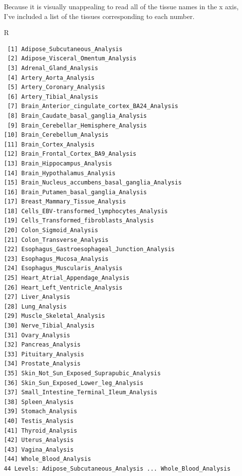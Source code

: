 \documentclass[11pt]{article}
\begin{document}
Because it is visually unappealing to read all of the tissue names in the x axis, I've included a list of the tissues corresponding to each number.


 R


\begin{verbatim}
 [1] Adipose_Subcutaneous_Analysis
 [2] Adipose_Visceral_Omentum_Analysis
 [3] Adrenal_Gland_Analysis
 [4] Artery_Aorta_Analysis
 [5] Artery_Coronary_Analysis
 [6] Artery_Tibial_Analysis
 [7] Brain_Anterior_cingulate_cortex_BA24_Analysis
 [8] Brain_Caudate_basal_ganglia_Analysis
 [9] Brain_Cerebellar_Hemisphere_Analysis
[10] Brain_Cerebellum_Analysis
[11] Brain_Cortex_Analysis
[12] Brain_Frontal_Cortex_BA9_Analysis
[13] Brain_Hippocampus_Analysis
[14] Brain_Hypothalamus_Analysis
[15] Brain_Nucleus_accumbens_basal_ganglia_Analysis
[16] Brain_Putamen_basal_ganglia_Analysis
[17] Breast_Mammary_Tissue_Analysis
[18] Cells_EBV-transformed_lymphocytes_Analysis
[19] Cells_Transformed_fibroblasts_Analysis
[20] Colon_Sigmoid_Analysis
[21] Colon_Transverse_Analysis
[22] Esophagus_Gastroesophageal_Junction_Analysis
[23] Esophagus_Mucosa_Analysis
[24] Esophagus_Muscularis_Analysis
[25] Heart_Atrial_Appendage_Analysis
[26] Heart_Left_Ventricle_Analysis
[27] Liver_Analysis
[28] Lung_Analysis
[29] Muscle_Skeletal_Analysis
[30] Nerve_Tibial_Analysis
[31] Ovary_Analysis
[32] Pancreas_Analysis
[33] Pituitary_Analysis
[34] Prostate_Analysis
[35] Skin_Not_Sun_Exposed_Suprapubic_Analysis
[36] Skin_Sun_Exposed_Lower_leg_Analysis
[37] Small_Intestine_Terminal_Ileum_Analysis
[38] Spleen_Analysis
[39] Stomach_Analysis
[40] Testis_Analysis
[41] Thyroid_Analysis
[42] Uterus_Analysis
[43] Vagina_Analysis
[44] Whole_Blood_Analysis
44 Levels: Adipose_Subcutaneous_Analysis ... Whole_Blood_Analysis
\end{verbatim}
\end{document}

